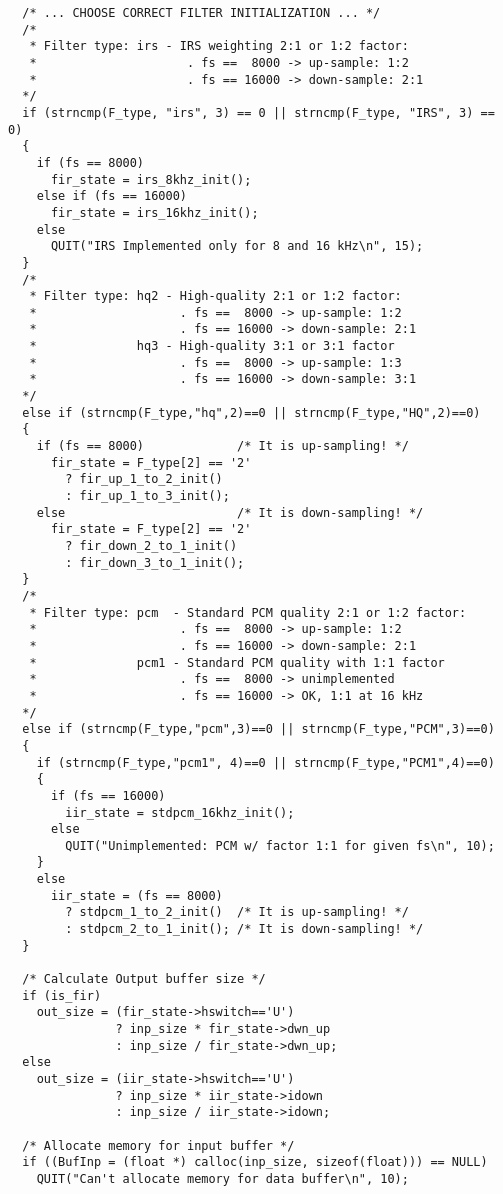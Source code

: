 {\begin{verbatim}
  /* ... CHOOSE CORRECT FILTER INITIALIZATION ... */
  /*
   * Filter type: irs - IRS weighting 2:1 or 1:2 factor:
   *                     . fs ==  8000 -> up-sample: 1:2
   *                     . fs == 16000 -> down-sample: 2:1
  */
  if (strncmp(F_type, "irs", 3) == 0 || strncmp(F_type, "IRS", 3) == 0)
  {
    if (fs == 8000)
      fir_state = irs_8khz_init();
    else if (fs == 16000)
      fir_state = irs_16khz_init();
    else
      QUIT("IRS Implemented only for 8 and 16 kHz\n", 15);
  }
  /*
   * Filter type: hq2 - High-quality 2:1 or 1:2 factor:
   *                    . fs ==  8000 -> up-sample: 1:2
   *                    . fs == 16000 -> down-sample: 2:1
   *              hq3 - High-quality 3:1 or 3:1 factor
   *                    . fs ==  8000 -> up-sample: 1:3
   *                    . fs == 16000 -> down-sample: 3:1
  */
  else if (strncmp(F_type,"hq",2)==0 || strncmp(F_type,"HQ",2)==0)
  {
    if (fs == 8000)             /* It is up-sampling! */
      fir_state = F_type[2] == '2'
        ? fir_up_1_to_2_init()
        : fir_up_1_to_3_init();
    else                        /* It is down-sampling! */
      fir_state = F_type[2] == '2'
        ? fir_down_2_to_1_init()
        : fir_down_3_to_1_init();
  }
  /*
   * Filter type: pcm  - Standard PCM quality 2:1 or 1:2 factor:
   *                    . fs ==  8000 -> up-sample: 1:2
   *                    . fs == 16000 -> down-sample: 2:1
   *              pcm1 - Standard PCM quality with 1:1 factor
   *                    . fs ==  8000 -> unimplemented
   *                    . fs == 16000 -> OK, 1:1 at 16 kHz
  */
  else if (strncmp(F_type,"pcm",3)==0 || strncmp(F_type,"PCM",3)==0)
  {
    if (strncmp(F_type,"pcm1", 4)==0 || strncmp(F_type,"PCM1",4)==0)
    {
      if (fs == 16000)
        iir_state = stdpcm_16khz_init();
      else
        QUIT("Unimplemented: PCM w/ factor 1:1 for given fs\n", 10);
    }
    else
      iir_state = (fs == 8000)
        ? stdpcm_1_to_2_init()  /* It is up-sampling! */
        : stdpcm_2_to_1_init(); /* It is down-sampling! */
  }

  /* Calculate Output buffer size */
  if (is_fir)
    out_size = (fir_state->hswitch=='U')
               ? inp_size * fir_state->dwn_up
               : inp_size / fir_state->dwn_up;
  else
    out_size = (iir_state->hswitch=='U')
               ? inp_size * iir_state->idown
               : inp_size / iir_state->idown;

  /* Allocate memory for input buffer */
  if ((BufInp = (float *) calloc(inp_size, sizeof(float))) == NULL)
    QUIT("Can't allocate memory for data buffer\n", 10);


\end{verbatim}}
